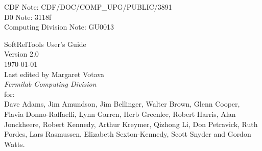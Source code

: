 \documentclass[12pt]{article}
\begin{document}
\begin{flushright}
\vspace*{0.5in}
CDF Note: CDF/DOC/COMP\_UPG/PUBLIC/3891 \\
D0 Note: 3118f \\
Computing Division Note: GU0013 \\
\end{flushright}
\vspace{0.5in}
\begin{center}
{\LARGE SoftRelTools User's Guide}\\
\vspace{.5in}
{\large Version 2.0}\\
{\large \today }\\
\vspace{.5in}
{\large Last edited by Margaret Votava}\\
{\large \em Fermilab Computing Division}\\
\vspace{.5in}
{\large for:\\
Dave Adams, Jim Amundson, Jim Bellinger, Walter Brown, Glenn Cooper, 
Flavia Donno-Raffaelli, Lynn Garren, 
Herb Greenlee, Robert Harris, Alan Jonckheere, Robert Kennedy, Arthur Kreymer, 
Qizhong Li, Don Petravick, Ruth Pordes, Lars Rasmussen, 
Elizabeth Sexton-Kennedy, Scott Snyder and Gordon Watts.}
\vspace{.5in}
\end{center}
\begin{abstract}
This is the user's guide for the Fermilab version of Software Release Tools, 
a UNIX based software management system for large, collaborative projects
that is used by several experiments at Fermilab.
The system provides software version control with CVS 
configured in a client-server mode.
For management and 
building we have adopted the directory structure and SoftRelTools originally 
developed by the BaBar collaboration. 
The system handles the 
version control, management, building, and distribution of code written in 
Fortran, C and C++. A distinguishing feature of the system is its
ability to allow rapid asynchronous development of 
package versions, 
which can be easily integrated into complete consistent
releases of the entire offline software.  This 
has reduced the time it takes for new and modified code to be made available to 
users. 
\end{abstract}

\clearpage
\tableofcontents
\listoffigures
\listoftables
\end{document}
